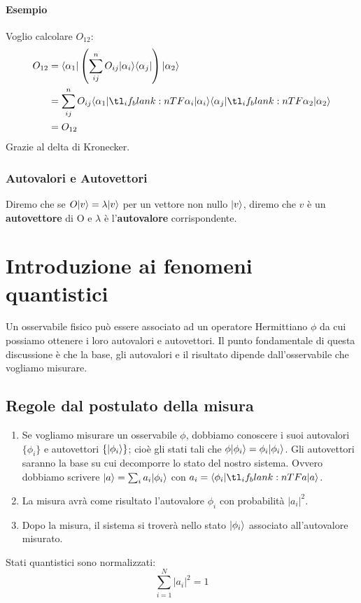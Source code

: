 \documentclass[12pt, a4paper]{report}
\begin{document}
\subsubsection{Esempio}
Voglio calcolare $O_{12}$:
\begin{equation*}
    \begin{split}
        O_{12} & =\bra{\alpha_{1}}\left(\sum_{ij}^{n}O_{ij}\ket{\alpha_{i}}\bra{\alpha_{j}}\right)\ket{\alpha_{2}}\\
        & = \sum_{ij}^{n} O_{ij}\braket{\alpha_{1}}{\alpha_{i}}\braket{\alpha_{j}}{\alpha_{2}} \\
        & = O_{12}
    \end{split}
\end{equation*}
Grazie al delta di Kronecker.
\subsection{Autovalori e Autovettori}
Diremo che se $O| v \rangle=\lambda| v \rangle$ per un vettore non nullo $| v \rangle$, diremo che $v$ è un \textbf{autovettore} di O e $\lambda$ è l'\textbf{autovalore} corrispondente.
\chapter{Introduzione ai fenomeni quantistici}
Un osservabile fisico può essere associato ad un operatore Hermittiano $\phi$ da cui possiamo ottenere i loro autovalori e autovettori. Il punto fondamentale di questa discussione è che la base, gli autovalori e il risultato dipende dall'osservabile che vogliamo misurare.
\section{Regole dal postulato della misura}
\begin{enumerate}
    \item Se vogliamo misurare un osservabile $\phi$, dobbiamo conoscere i suoi autovalori $\{\phi_{i}\}$ e autovettori $\{| \phi_{i} \rangle\}$; cioè gli stati tali che $\phi| \phi_{i} \rangle=\phi_{i}| \phi_{i} \rangle$. Gli autovettori saranno la base su cui decomporre lo stato del nostro sistema. Ovvero dobbiamo scrivere $| a \rangle=\sum_{i}a_{i}| \phi_{i} \rangle$ con $a_{i}=\braket{\phi_{i}}{a}$.
    \item La misura avrà come risultato l'autovalore $\phi_{i}$ con probabilità $|a_{i}|^{2}$.
    \item Dopo la misura, il sistema si troverà nello stato $| \phi_{i} \rangle$ associato all'autovalore misurato.
\end{enumerate}
Stati quantistici sono normalizzati:
\begin{equation*}
    \sum_{i=1}^{N}|a_{i}|^{2}=1
\end{equation*}
\end{document}
